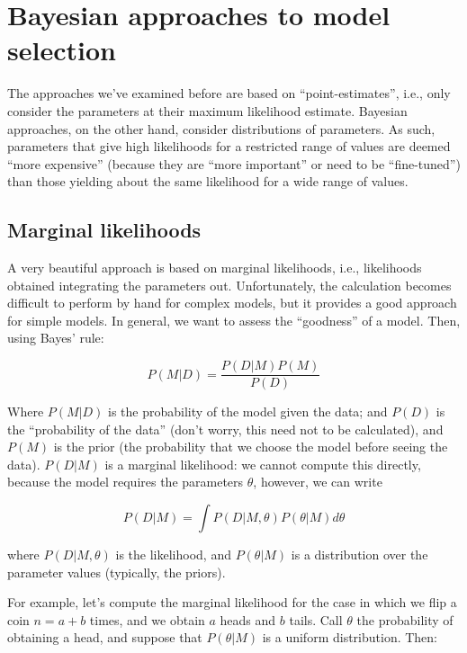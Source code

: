 \documentclass[
  letterpaper,
  DIV=11,
  numbers=noendperiod]{scrreprt}
\begin{document}
\hypertarget{bayesian-approaches-to-model-selection}{%
\section{Bayesian approaches to model
selection}\label{bayesian-approaches-to-model-selection}}

The approaches we've examined before are based on ``point-estimates'',
i.e., only consider the parameters at their maximum likelihood estimate.
Bayesian approaches, on the other hand, consider distributions of
parameters. As such, parameters that give high likelihoods for a
restricted range of values are deemed ``more expensive'' (because they
are ``more important'' or need to be ``fine-tuned'') than those yielding
about the same likelihood for a wide range of values.

\hypertarget{marginal-likelihoods}{%
\subsection{Marginal likelihoods}\label{marginal-likelihoods}}

A very beautiful approach is based on marginal likelihoods, i.e.,
likelihoods obtained integrating the parameters out. Unfortunately, the
calculation becomes difficult to perform by hand for complex models, but
it provides a good approach for simple models. In general, we want to
assess the ``goodness'' of a model. Then, using Bayes' rule:

\[
  P(M\vert D) = \frac{P(D\vert M) P(M)}{P(D)}
\]

Where \(P(M\vert D)\) is the probability of the model given the data;
and \(P(D)\) is the ``probability of the data'' (don't worry, this need
not to be calculated), and \(P(M)\) is the prior (the probability that
we choose the model before seeing the data). \(P(D\vert M)\) is a
marginal likelihood: we cannot compute this directly, because the model
requires the parameters \(\theta\), however, we can write

\[
P(D\vert M) = \int P(D\vert M,\theta)P(\theta\vert M) d\theta
\]

where \(P(D\vert M,\theta)\) is the likelihood, and \(P(\theta\vert M)\)
is a distribution over the parameter values (typically, the priors).

For example, let's compute the marginal likelihood for the case in which
we flip a coin \(n = a + b\) times, and we obtain \(a\) heads and \(b\)
tails. Call \(\theta\) the probability of obtaining a head, and suppose
that \(P(\theta\vert M)\) is a uniform distribution. Then:
\end{document}
